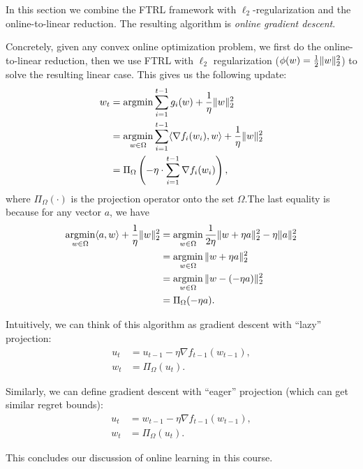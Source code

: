 In this section we combine the FTRL framework with $\ell_2$-regularization and the online-to-linear reduction. The resulting algorithm is \textit{online gradient descent}.

Concretely, given any convex online optimization problem, we first do the online-to-linear reduction, then we use FTRL with $\ell_2$ regularization ($\phi (w) = \frac{1}{2}\|w\|_2^2$) to solve the resulting linear case. This gives us the following update:
\begin{align}
w_t &= \operatorname*{\textup{argmin}} \sum_{i=1}^{t-1} g_i(w) + \frac{1}{\eta} \|w\|_2^2 \\
&= \operatorname*{\textup{argmin}}_{w \in \Omega} \sum_{i=1}^{t-1} \langle \nabla f_i(w_i), w \rangle + \frac{1}{\eta} \|w\|_2^2 \\
&= \Pi_\Omega \left( -\eta \cdot \sum_{i=1}^{t-1} \nabla f_i(w_i) \right),
\end{align}
where $\Pi_\Omega (\cdot)$ is the projection operator onto the set $\Omega$.The last equality is because for any vector $a$, we have 
\begin{align}
\operatorname*{\textup{argmin}}_{w \in \Omega} \langle a, w\rangle + \frac{1}{\eta} \|w\|_2^2 & = \operatorname*{\textup{argmin}}_{w \in \Omega} \frac{1}{2\eta} \|w + \eta a\|_2^2 - \eta \|a\|_2^2 \\
& = \operatorname*{\textup{argmin}}_{w \in \Omega} \|w + \eta a\|_2^2 \\
& = \operatorname*{\textup{argmin}}_{w \in \Omega} \|w - (-\eta a)\|_2^2 \\
& = \Pi_\Omega(-\eta a).
\end{align}

Intuitively, we can think of this algorithm as gradient descent with ``lazy'' projection:
\begin{align}
u_t &= u_{t-1} - \eta \nabla f_{t-1}(w_{t-1}), \\
w_t &= \Pi_\Omega(u_t).
\end{align}

Similarly, we can define gradient descent with ``eager'' projection (which can get similar regret bounds):
\begin{align}
u_t &= w_{t-1} - \eta \nabla f_{t-1}(w_{t-1}), \\
w_t &= \Pi_\Omega(u_t).
\end{align}

This concludes our discussion of online learning in this course.